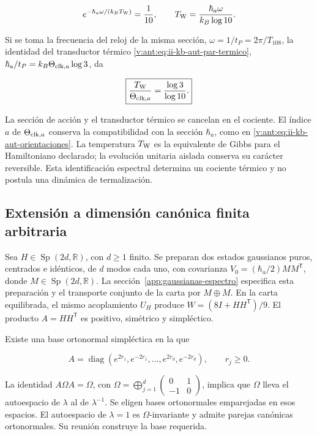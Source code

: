 \[
e^{-\hbar_a\omega/(k_BT_{\rm W})}=\frac1{10},\qquad
T_{\rm W}=\frac{\hbar_a\omega}{k_B\log10}.
\]



Si se toma la frecuencia del reloj de la misma sección, \(\omega=1/t_P=2\pi/T_{108}\), la identidad del transductor térmico \eqref{v:ant:eq:ii-kb-aut-par-termico},
\(\hbar_a/t_P=k_B\Theta_{{\rm clk},a}\log3\), da



\begin{equation}
\boxed{\frac{T_{\rm W}}{\Theta_{{\rm clk},a}}=\frac{\log3}{\log10}.}
\label{nuc12:eq:5.11}
\end{equation}



La sección de acción y el transductor térmico se cancelan en el cociente. El índice \(a\) de \(\Theta_{{\rm clk},a}\) conserva la compatibilidad con la sección \(\hbar_a\), como en \eqref{v:ant:eq:ii-kb-aut-orientaciones}. La temperatura \(T_{\rm W}\) es la equivalente de Gibbs para el Hamiltoniano declarado; la evolución unitaria aislada conserva su carácter reversible. Esta identificación espectral determina un cociente térmico y no postula una dinámica de termalización.

\subsection{Extensión a dimensión canónica finita arbitraria}

Sea \(H\in\operatorname{Sp}(2d,\mathbb R)\), con \(d\geq1\) finito. Se preparan dos estados gaussianos puros, centrados e idénticos, de \(d\) modos cada uno, con covarianza \(V_0=(\hbar_a/2)MM^{\mathsf T}\), donde \(M\in\operatorname{Sp}(2d,\mathbb R)\). La sección~\ref{app:gaussianas-espectro} especifica esta preparación y el transporte conjunto de la carta por \(M\oplus M\). En la carta equilibrada, el mismo acoplamiento \(U_H\) produce \(W=(8I+HH^{\mathsf T})/9\). El producto \(A=HH^{\mathsf T}\) es positivo, simétrico y simpléctico.

Existe una base ortonormal simpléctica en la que


\[
A=\operatorname{diag}(e^{2r_1},e^{-2r_1},\ldots,
e^{2r_d},e^{-2r_d}),\qquad r_j\ge0.
\]



La identidad \(A\Omega A=\Omega\), con \(\Omega=\bigoplus_{j=1}^d\left(\begin{smallmatrix}0&1\\-1&0\end{smallmatrix}\right)\), implica que \(\Omega\) lleva el autoespacio de \(\lambda\) al de \(\lambda^{-1}\). Se eligen bases ortonormales emparejadas en esos espacios. El autoespacio de \(\lambda=1\) es \(\Omega\)-invariante y admite parejas canónicas ortonormales. Su reunión construye la base requerida.

